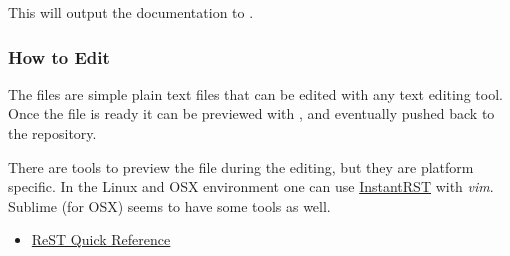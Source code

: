 \documentclass[a4,10pt,openany,oneside]{sphinxmanual}
\begin{document}
This will output the documentation to .


\subsubsection{How to Edit}
\label{development/documentation:how-to-edit}
The  files are simple plain text files that can be edited with any text editing tool.
Once the file is ready it can be previewed with , and eventually pushed back to
the repository.

There are tools to preview the  file during the editing, but they are platform specific.
In the Linux and OSX environment one can use \href{https://github.com/Rykka/InstantRst}{InstantRST}
with \emph{vim}. Sublime (for OSX) seems to have some tools as well.
\begin{itemize}
\item {} 
\href{http://docutils.sourceforge.net/docs/user/rst/quickref.html}{ReST Quick Reference}

\end{itemize}



\renewcommand{\indexname}{Index}
\printindex
\end{document}
